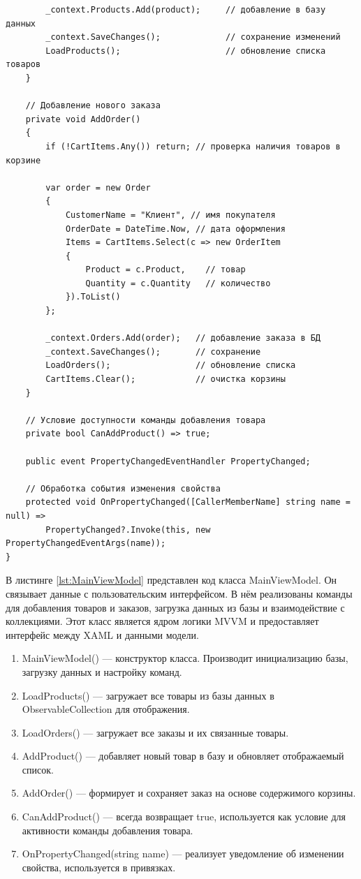 \documentclass[12pt]{article}
\renewcommand{\texttt}[1]{{\small\ttfamily #1}}
\newenvironment{code}{\captionsetup{type=listing}}{}
\numberwithin{listing}{section}
\numberwithin{figure}{section}
\begin{document}
\begin{code}
\begin{verbatim}
        _context.Products.Add(product);     // добавление в базу данных
        _context.SaveChanges();             // сохранение изменений
        LoadProducts();                     // обновление списка товаров
    }

    // Добавление нового заказа
    private void AddOrder()
    {
        if (!CartItems.Any()) return; // проверка наличия товаров в корзине

        var order = new Order
        {
            CustomerName = "Клиент", // имя покупателя
            OrderDate = DateTime.Now, // дата оформления
            Items = CartItems.Select(c => new OrderItem
            {
                Product = c.Product,    // товар
                Quantity = c.Quantity   // количество
            }).ToList()
        };

        _context.Orders.Add(order);   // добавление заказа в БД
        _context.SaveChanges();       // сохранение
        LoadOrders();                 // обновление списка
        CartItems.Clear();            // очистка корзины
    }

    // Условие доступности команды добавления товара
    private bool CanAddProduct() => true;

    public event PropertyChangedEventHandler PropertyChanged;

    // Обработка события изменения свойства
    protected void OnPropertyChanged([CallerMemberName] string name = null) =>
        PropertyChanged?.Invoke(this, new PropertyChangedEventArgs(name));
}
    \end{verbatim}
	\label{lst:MainViewModel}
\end{code}
В листинге \ref{lst:MainViewModel} представлен код класса \texttt{MainViewModel}. Он связывает данные с пользовательским интерфейсом. В нём реализованы команды для добавления товаров и заказов, загрузка данных из базы и взаимодействие с коллекциями. Этот класс является ядром логики MVVM и предоставляет интерфейс между XAML и данными модели.


\begin{enumerate}
	\item \texttt{MainViewModel()} — конструктор класса. Производит инициализацию базы, загрузку данных и настройку команд.
	\item \texttt{LoadProducts()} — загружает все товары из базы данных в \texttt{ObservableCollection} для отображения.
	\item \texttt{LoadOrders()} — загружает все заказы и их связанные товары.
	\item \texttt{AddProduct()} — добавляет новый товар в базу и обновляет отображаемый список.
	\item \texttt{AddOrder()} — формирует и сохраняет заказ на основе содержимого корзины.
	\item \texttt{CanAddProduct()} — всегда возвращает true, используется как условие для активности команды добавления товара.
	\item \texttt{OnPropertyChanged(string name)} — реализует уведомление об изменении свойства, используется в привязках.
\end{enumerate}
\end{document}
